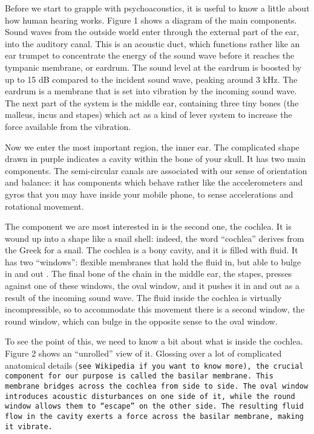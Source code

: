 

  Before we start to grapple with psychoacoustics, it is useful to know a 
  little about how human hearing works. Figure 1 shows a diagram of the main 
  components. Sound waves from the outside world enter through the external 
  part of the ear, into the auditory canal. This is an acoustic duct, which 
  functions rather like an ear trumpet to concentrate the energy of the sound 
  wave before it reaches the tympanic membrane, or eardrum. The sound level at 
  the eardrum is boosted by up to 15 dB compared to the incident sound wave, 
  peaking around 3 kHz. The eardrum is a membrane that is set into vibration by 
  the incoming sound wave. The next part of the system is the middle ear, 
  containing three tiny bones (the malleus, incus and stapes) which act as a 
  kind of lever system to increase the force available from the vibration. 

  Now we enter the most important region, the inner ear. The complicated shape 
  drawn in purple indicates a cavity within the bone of your skull. It has two 
  main components. The semi-circular canals are associated with our sense of 
  orientation and balance: it has components which behave rather like the 
  accelerometers and gyros that you may have inside your mobile phone, to sense 
  accelerations and rotational movement. 

  The component we are most interested in is the second one, the cochlea. It is 
  wound up into a shape like a snail shell: indeed, the word ``cochlea'' 
  derives from the Greek for a snail. The cochlea is a bony cavity, and it is 
  filled with fluid. It has two ``windows'': flexible membranes that hold the 
  fluid in, but able to bulge in and out . The final bone of the chain in the 
  middle ear, the stapes, presses against one of these windows, the oval 
  window, and it pushes it in and out as a result of the incoming sound wave. 
  The fluid inside the cochlea is virtually incompressible, so to accommodate 
  this movement there is a second window, the round window, which can bulge in 
  the opposite sense to the oval window. 

  To see the point of this, we need to know a bit about what is inside the 
  cochlea. Figure 2 shows an ``unrolled'' view of it. Glossing over a lot of 
  complicated anatomical details (\tt{}see Wikipedia\rm{} if you want to know 
  more), the crucial component for our purpose is called the basilar membrane. 
  This membrane bridges across the cochlea from side to side. The oval window 
  introduces acoustic disturbances on one side of it, while the round window 
  allows them to ``escape'' on the other side. The resulting fluid flow in the 
  cavity exerts a force across the basilar membrane, making it vibrate. 

